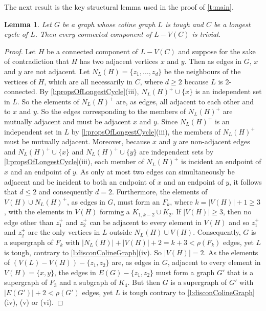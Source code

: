 \documentclass[12pt]{article}
\newtheorem{lem}[thm]{Lemma}
\theoremstyle{definition}
\begin{document}
The next result is the key structural lemma used in the proof of \cref{t:main}.

\begin{lem}\label{l:eachCompTrivial}
Let $G$ be a graph whose coline graph $L$ is tough and $C$ be a longest cycle of $L$. Then every connected component of $L-V(C)$ is trivial.
\end{lem}
\begin{proof}
Let $H$ be a connected component of $L-V(C)$ and suppose for the sake of contradiction that 
$H$ has two adjacent vertices $x$ and $y$. 
Then as edges in $G$, $x$ and $y$ are not adjacent. 
Let $N_L(H)=\{z_1,\ldots ,z_d\}$ be the neighbours of the vertices of $H$, which are all necessarily in $C$, where $d\geq 2$ because $L$ is 2-connected. By \cref{l:propsOfLongestCycle}(iii), $N_L(H)^+\cup \{x\}$ is an independent set in $L$.
So the elements of $N_L(H)^+$ are, as edges, all adjacent to each other and to $x$ and $y$. So the edges corresponding to the members of $N_L(H)^+$ are mutually adjacent and must be adjacent $x$ and $y$.
Since $N_L(H)^+$ is an independent set in $L$ by \cref{l:propsOfLongestCycle}(iii), the members of $N_L(H)^+$ must be mutually adjacent.
Moreover, because $x$ and $y$ are non-adjacent edges and $N_L(H)^+\cup \{x\}$ and $N_L(H)^+\cup \{y\}$ are independent sets by \cref{l:propsOfLongestCycle}(iii), each member of $N_L(H)^+$ is incident an endpoint of $x$ and an endpoint of $y$. As only at most two edges can simultaneously be adjacent and be incident to both an endpoint of $x$ and an endpoint of $y$, it follows that $d\leq 2$ and consequently $d=2$. Furthermore, 
the elements of $V(H)\cup N_L(H)^+$, as edges in $G$, must form an $F_{k}$, where $k=|V(H)|+1 \geq 3$, with the elements in $V(H)$ forming a $K_{1,k-2}\cup K_2$. If $|V(H)|\geq 3$, then no edge other than $z_1^+$ and $z_2^+$ can be adjacent to every element in $V(H)$ and so $z_1^+$ and $z_2^+$ are the only vertices in $L$ outside $N_L(H)\cup V(H)$. Consequently, $G$ is a supergraph of $F_k$ with $|N_L(H)|+|V(H)|+2= k+3 < \rho(F_k)$ edges, yet $L$ is tough, contrary to \cref{l:disconColineGraph}(iv).
So $|V(H)|=2$. As the elements of $\left(V(L)-V(H)\right)-\{z_1,z_2\}$ are, as edges in $G$, adjacent to every element in $V(H)=\{x,y\}$, the edges in $E(G)-\{z_1,z_2\}$ must form a graph $G'$ that is a supergraph of $F_3$ and a subgraph of $K_4$. But then $G$ is a supergraph of $G'$ with $|E(G')|+2 < \rho(G')$ edges, yet $L$ is tough contrary to \cref{l:disconColineGraph}(iv), (v) or (vi).
\end{proof}
\end{document}
